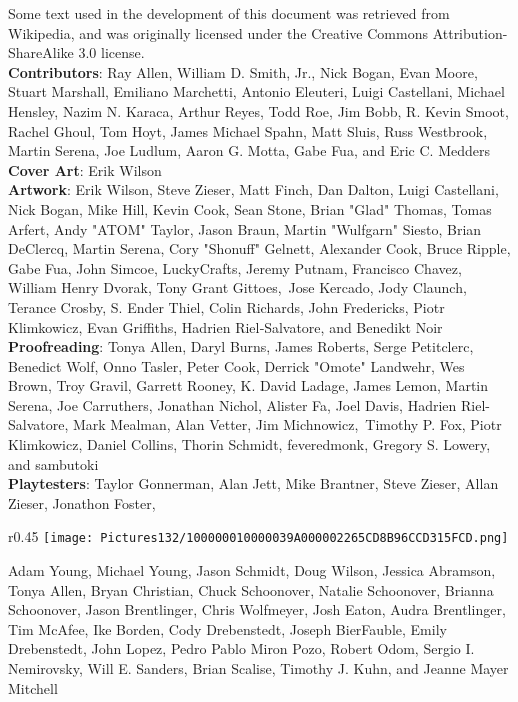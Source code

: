 \documentclass[a4paper,twoside,openany,10pt]{book}
\begin{document}
Some text used in the development of this document was retrieved from Wikipedia, and was originally licensed under the Creative Commons Attribution-ShareAlike 3.0 license.\\

\textbf{Contributors}: Ray Allen, William D. Smith, Jr., Nick Bogan, Evan Moore, Stuart Marshall, Emiliano Marchetti, Antonio Eleuteri, Luigi Castellani, Michael Hensley, Nazim N. Karaca, Arthur Reyes, Todd Roe, Jim Bobb, R. Kevin Smoot, Rachel Ghoul, Tom Hoyt, James Michael Spahn, Matt Sluis, Russ Westbrook, Martin Serena, Joe Ludlum, Aaron G. Motta, Gabe Fua, and Eric C. Medders\\

\textbf{Cover Art}: Erik Wilson\\

\textbf{Artwork}: Erik Wilson, Steve Zieser, Matt Finch, Dan Dalton, Luigi Castellani, Nick Bogan, Mike Hill, Kevin Cook, Sean Stone, Brian "Glad" Thomas, Tomas Arfert, Andy "ATOM" Taylor, Jason Braun, Martin "Wulfgarn" Siesto, Brian DeClercq, Martin Serena, Cory "Shonuff" Gelnett, Alexander Cook, Bruce Ripple, Gabe Fua, John Simcoe, LuckyCrafts, Jeremy Putnam, Francisco Chavez, William Henry Dvorak, Tony Grant Gittoes, \,Jose Kercado, Jody Claunch, Terance Crosby, S. Ender Thiel, Colin Richards, John Fredericks, Piotr Klimkowicz, Evan Griffiths, Hadrien Riel‑Salvatore, and Benedikt Noir\\

\textbf{Proofreading}: Tonya Allen, Daryl Burns, James Roberts, Serge Petitclerc, Benedict Wolf, Onno Tasler, Peter Cook, Derrick "Omote" Landwehr, Wes Brown, Troy Gravil, Garrett Rooney, K. David Ladage, James Lemon, Martin Serena, Joe Carruthers, Jonathan Nichol, Alister Fa, Joel Davis, Hadrien Riel-Salvatore, Mark Mealman, Alan Vetter, Jim Michnowicz, \,Timothy P. Fox, Piotr Klimkowicz, Daniel Collins, Thorin Schmidt, feveredmonk, Gregory S. Lowery, and sambutoki\\

\textbf{Playtesters}: Taylor Gonnerman, Alan Jett, Mike Brantner, Steve Zieser, Allan Zieser, Jonathon Foster, 
\begin{wrapfigure}{r}{0.45\textwidth}
	\texttt{[image: Pictures132/100000010000039A000002265CD8B96CCD315FCD.png]}
\end{wrapfigure}
Adam Young, Michael Young, Jason Schmidt, Doug Wilson, Jessica Abramson, Tonya Allen, Bryan Christian, Chuck Schoonover, Natalie Schoonover, Brianna Schoonover, Jason Brentlinger, Chris Wolfmeyer, Josh Eaton, Audra Brentlinger, Tim McAfee, Ike Borden, Cody Drebenstedt, Joseph BierFauble, Emily Drebenstedt, John Lopez, Pedro Pablo Miron Pozo, Robert Odom, Sergio I. Nemirovsky, Will E. Sanders, Brian Scalise, Timothy J. Kuhn, and Jeanne Mayer Mitchell\\
\end{document}
